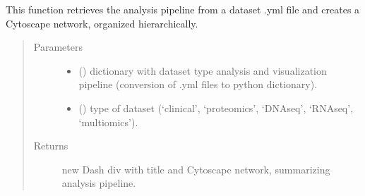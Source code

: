 \documentclass[letterpaper,10pt,english]{sphinxmanual}
\begin{document}

\begin{fulllineitems}
\label{\detokenize{_autosummary/analytics_core.viz:analytics_core.viz.viz.generate_configuration_tree}}
This function retrieves the analysis pipeline from a dataset .yml file and creates a Cytoscape network, organized hierarchically.
\begin{quote}\begin{description}
\item[{Parameters}] \leavevmode\begin{itemize}
\item {} 
 () \textendash{} dictionary with dataset type analysis and visualization pipeline (conversion of .yml files to python dictionary).

\item {} 
 () \textendash{} type of dataset (‘clinical’, ‘proteomics’, ‘DNAseq’, ‘RNAseq’, ‘multiomics’).

\end{itemize}

\item[{Returns}] \leavevmode
new Dash div with title and Cytoscape network, summarizing analysis pipeline.

\end{description}\end{quote}

\end{fulllineitems}

\end{document}
